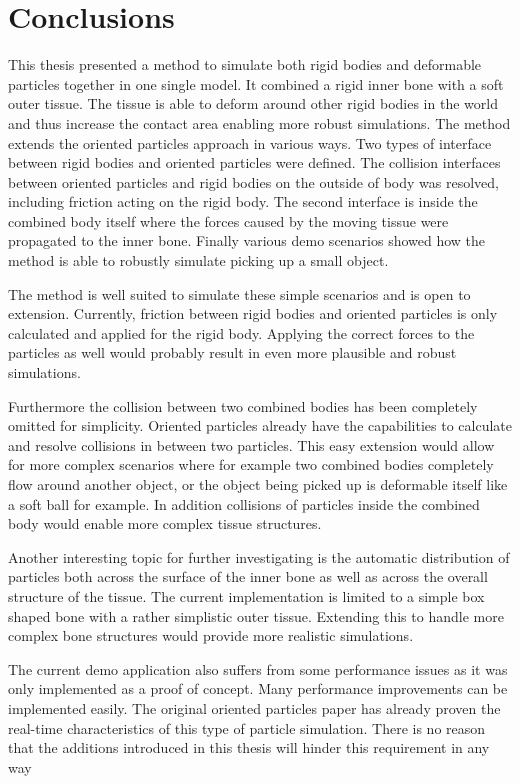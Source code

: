 \chapter{Conclusions}
\label{cha:conclusions}

This thesis presented a method to simulate both rigid bodies and deformable particles together in one single model. It combined a rigid inner bone with a soft outer tissue. The tissue is able to deform around other rigid bodies in the world and thus increase the contact area enabling more robust simulations. The method extends the oriented particles approach in various ways. Two types of interface between rigid bodies and oriented particles were defined. The collision interfaces between oriented particles and rigid bodies on the outside of body was resolved, including friction acting on the rigid body. The second interface is inside the combined body itself where the forces caused by the moving tissue were propagated to the inner bone. Finally various demo scenarios showed how the method is able to robustly simulate picking up a small object.

The method is well suited to simulate these simple scenarios and is open to extension. Currently, friction between rigid bodies and oriented particles is only calculated and applied for the rigid body. Applying the correct forces to the particles as well would probably result in even more plausible and robust simulations.

Furthermore the collision between two combined bodies has been completely omitted for simplicity. Oriented particles already have the capabilities to calculate and resolve collisions in between two particles. This easy extension would allow for more complex scenarios where for example two combined bodies completely flow around another object, or the object being picked up is deformable itself like a soft ball for example. In addition collisions of particles inside the combined body would enable more complex tissue structures.

Another interesting topic for further investigating is the automatic distribution of particles both across the surface of the inner bone as well as across the overall structure of the tissue. The current implementation is limited to a simple box shaped bone with a rather simplistic outer tissue. Extending this to handle more complex bone structures would provide more realistic simulations.

The current demo application also suffers from some performance issues as it was only implemented as a proof of concept. Many performance improvements can be implemented easily. The original oriented particles paper has already proven the real-time characteristics of this type of particle simulation. There is no reason that the additions introduced in this thesis will hinder this requirement in any way


